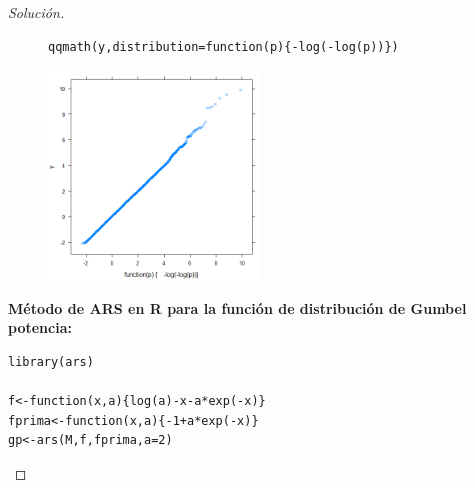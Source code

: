 \documentclass[11pt]{article}
\renewcommand{\=}[1]{\stackrel{#1}{=}} %
\newenvironment{sol}
{\begin{proof}[Solución]}
	{\end{proof}}
\theoremstyle{definition}
\theoremstyle{remark}
\begin{document}
\begin{itemize}
\begin{sol}
\begin{figure}[h]
\begin{minipage}{10cm}
{\begin{lstlisting}[style=myRstyle, caption={Verificación mediante gráfica de cuantiles / GUMBEL.}]
qqmath(y,distribution=function(p){-log(-log(p))})
			\end{lstlisting}
		}			
	\end{minipage}
	\begin{minipage}{6cm}
		\includegraphics[width=5.6cm]{mi0}
	\end{minipage}
\end{figure}
\newpage
{\bf Método de ARS en R para la función de distribución de Gumbel potencia:}
{
	\begin{lstlisting}[style=myRstyle, caption={Algoritmo ARS / GUMBEL POTENCIA.}]
library(ars)

f<-function(x,a){log(a)-x-a*exp(-x)}
fprima<-function(x,a){-1+a*exp(-x)}
gp<-ars(M,f,fprima,a=2)
	\end{lstlisting}
}


\end{sol}
\end{itemize}
\end{document}
